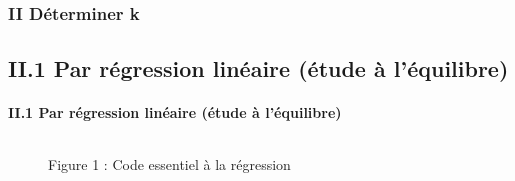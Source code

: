 \documentclass{beamer}
\begin{document}
\begin{frame}

    \frametitle{II Déterminer k}

    \subsection{II.1 Par régression linéaire (étude à l'équilibre)}
    \framesubtitle{II.1 Par régression linéaire (étude à l'équilibre)}

        \begin{columns}
            \begin{column}{0.5\textwidth}
                \begin{figure}
                    \parbox[b]{\linewidth}{\centering \tiny Figure 1 : Code essentiel à la régression}
                \end{figure}


\end{column}
\end{columns}
\end{frame}
\end{document}

